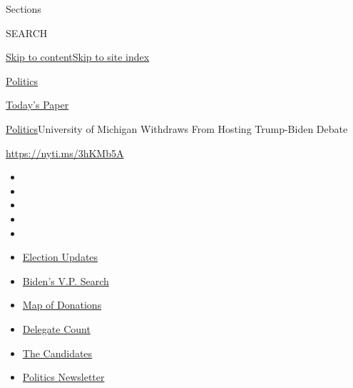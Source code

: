 Sections

SEARCH

\protect\hyperlink{site-content}{Skip to
content}\protect\hyperlink{site-index}{Skip to site index}

\href{https://www.nytimes.com/section/politics}{Politics}

\href{https://myaccount.nytimes.com/auth/login?response_type=cookie\&client_id=vi}{}

\href{https://www.nytimes.com/section/todayspaper}{Today's Paper}

\href{/section/politics}{Politics}\textbar{}University of Michigan
Withdraws From Hosting Trump-Biden Debate

\url{https://nyti.ms/3hKMb5A}

\begin{itemize}
\item
\item
\item
\item
\item
\end{itemize}

\begin{itemize}
\item
  \href{https://www.nytimes.com/2020/07/31/us/elections/biden-vs-trump.html?action=click\&pgtype=Article\&state=default\&region=TOP_BANNER\&context=storylines_menu}{Election
  Updates}
\item
  \href{https://www.nytimes.com/article/biden-vice-president-2020.html?action=click\&pgtype=Article\&state=default\&region=TOP_BANNER\&context=storylines_menu}{Biden's
  V.P. Search}
\item
  \href{https://www.nytimes.com/interactive/2020/07/24/us/politics/trump-biden-campaign-donors.html?action=click\&pgtype=Article\&state=default\&region=TOP_BANNER\&context=storylines_menu}{Map
  of Donations}
\item
  \href{https://www.nytimes.com/interactive/2020/us/elections/delegate-count-primary-results.html?action=click\&pgtype=Article\&state=default\&region=TOP_BANNER\&context=storylines_menu}{Delegate
  Count}
\item
  \href{https://www.nytimes.com/interactive/2019/us/politics/2020-presidential-candidates.html?action=click\&pgtype=Article\&state=default\&region=TOP_BANNER\&context=storylines_menu}{The
  Candidates}
\item
  \href{https://www.nytimes.com/newsletters/politics?action=click\&pgtype=Article\&state=default\&region=TOP_BANNER\&context=storylines_menu}{Politics
  Newsletter}
\end{itemize}

